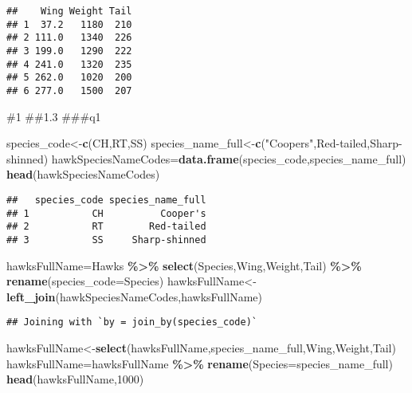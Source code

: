 \documentclass[
]{article}
\newenvironment{Shaded}{\begin{snugshade}}{\end{snugshade}}
\newcommand{\AttributeTok}[1]{\textcolor[rgb]{0.13,0.29,0.53}{#1}}
\newcommand{\DecValTok}[1]{\textcolor[rgb]{0.00,0.00,0.81}{#1}}
\newcommand{\FunctionTok}[1]{\textcolor[rgb]{0.13,0.29,0.53}{\textbf{#1}}}
\newcommand{\NormalTok}[1]{#1}
\newcommand{\OtherTok}[1]{\textcolor[rgb]{0.56,0.35,0.01}{#1}}
\newcommand{\SpecialCharTok}[1]{\textcolor[rgb]{0.81,0.36,0.00}{\textbf{#1}}}
\newcommand{\StringTok}[1]{\textcolor[rgb]{0.31,0.60,0.02}{#1}}
\begin{document}
\begin{verbatim}
##    Wing Weight Tail
## 1  37.2   1180  210
## 2 111.0   1340  226
## 3 199.0   1290  222
## 4 241.0   1320  235
## 5 262.0   1020  200
## 6 277.0   1500  207
\end{verbatim}

\#1 \#\#1.3 \#\#\#q1

\begin{Shaded}
\begin{Highlighting}[]
\NormalTok{species\_code}\OtherTok{\textless{}{-}}\FunctionTok{c}\NormalTok{(}\StringTok{\textquotesingle{}CH\textquotesingle{}}\NormalTok{,}\StringTok{\textquotesingle{}RT\textquotesingle{}}\NormalTok{,}\StringTok{\textquotesingle{}SS\textquotesingle{}}\NormalTok{)}
\NormalTok{species\_name\_full}\OtherTok{\textless{}{-}}\FunctionTok{c}\NormalTok{(}\StringTok{"Cooper\textquotesingle{}s"}\NormalTok{,}\StringTok{\textquotesingle{}Red{-}tailed\textquotesingle{}}\NormalTok{,}\StringTok{\textquotesingle{}Sharp{-}shinned\textquotesingle{}}\NormalTok{)}
\NormalTok{hawkSpeciesNameCodes}\OtherTok{=}\FunctionTok{data.frame}\NormalTok{(species\_code,species\_name\_full)}
\FunctionTok{head}\NormalTok{(hawkSpeciesNameCodes)}
\end{Highlighting}
\end{Shaded}

\begin{verbatim}
##   species_code species_name_full
## 1           CH          Cooper's
## 2           RT        Red-tailed
## 3           SS     Sharp-shinned
\end{verbatim}

\begin{Shaded}
\begin{Highlighting}[]
\NormalTok{hawksFullName}\OtherTok{=}\NormalTok{Hawks }\SpecialCharTok{\%\textgreater{}\%}
  \FunctionTok{select}\NormalTok{(Species,Wing,Weight,Tail) }\SpecialCharTok{\%\textgreater{}\%}
  \FunctionTok{rename}\NormalTok{(}\AttributeTok{species\_code=}\NormalTok{Species)}
\NormalTok{hawksFullName}\OtherTok{\textless{}{-}}\FunctionTok{left\_join}\NormalTok{(hawkSpeciesNameCodes,hawksFullName)}
\end{Highlighting}
\end{Shaded}

\begin{verbatim}
## Joining with `by = join_by(species_code)`
\end{verbatim}

\begin{Shaded}
\begin{Highlighting}[]
\NormalTok{hawksFullName}\OtherTok{\textless{}{-}}\FunctionTok{select}\NormalTok{(hawksFullName,species\_name\_full,Wing,Weight,Tail)}
\NormalTok{hawksFullName}\OtherTok{=}\NormalTok{hawksFullName }\SpecialCharTok{\%\textgreater{}\%} \FunctionTok{rename}\NormalTok{(}\AttributeTok{Species=}\NormalTok{species\_name\_full)}
\FunctionTok{head}\NormalTok{(hawksFullName,}\DecValTok{1000}\NormalTok{)}
\end{Highlighting}
\end{Shaded}
\end{document}
